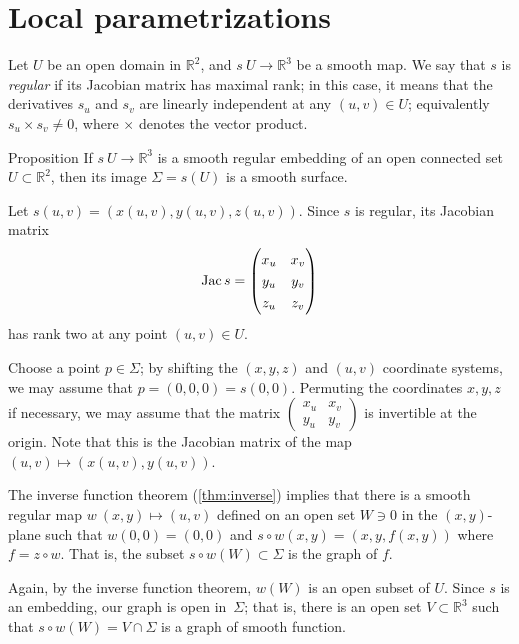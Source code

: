 \section{Local parametrizations}

Let $U$ be an open domain in $\mathbb{R}^2$, and $s\:U\to \mathbb{R}^3$ be a smooth map.
We say that $s$ is \emph{regular} if its Jacobian matrix has maximal rank;
in this case, it means that the derivatives $s_u$ and $s_v$ are linearly independent at any $(u,v)\in U$;
equivalently $s_u\times s_v\ne 0$, where $\times$ denotes the vector product.

\begin{thm}{Proposition}\label{prop:graph-chart}
If $s\:U\to \mathbb{R}^3$ is a smooth regular embedding of an open connected set $U\subset \mathbb{R}^2$, then its image $\Sigma=s(U)$ is a smooth surface.
\end{thm}

Let $s(u,v)=(x(u,v),y(u,v),z(u,v))$.
Since $s$ is regular, its Jacobian matrix
\[\Jac s=
\renewcommand\arraystretch{1.3}
\begin{pmatrix}
x_u&x_v\\
y_u&y_v\\
z_u&z_v
\end{pmatrix}
\]
has rank two at any point $(u,v)\in U$.

Choose a point $p\in \Sigma$; by shifting the $(x,y,z)$ and $(u,v)$ coordinate systems, we may assume that $p = (0,0, 0) =s(0,0)$.
Permuting the coordinates $x,y,z$ if necessary, we may assume that 
the matrix $\left(\begin{smallmatrix}
x_u&x_v\\
y_u&y_v
\end{smallmatrix}\right)$
is invertible at the origin.
Note that this is the Jacobian matrix of the map $(u,v)\mapsto (x(u,v),y(u,v))$.

The inverse function theorem (\ref{thm:inverse}) implies that there is a smooth regular map
$w\:(x,y)\mapsto (u,v)$ defined on an open set $W\ni 0$ in the $(x,y)$-plane
such that $w(0,0)=(0,0)$ and  $s\circ w(x,y)=(x,y,f(x,y))$ where $f=z\circ w$.
That is, the subset $s\circ w(W)\subset \Sigma$ is 
the graph of $f$.

Again, by the inverse function theorem, $w(W)$ is an open subset of $U$.
Since $s$ is an embedding, our graph is open in~$\Sigma$;
that is, there is an open set $V\subset \mathbb{R}^3$ such that $s\circ w(W)=V\cap \Sigma$ is a graph of smooth function.

